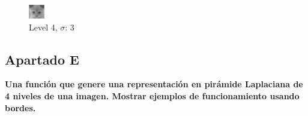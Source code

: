 \documentclass{article}
\begin{document}
\begin{minipage}{\linewidth}
     \begin{minipage}{0.45\linewidth}
        \begin{figure}[H]
            \includegraphics[width=\linewidth]{Ejercicio2d/cat4.png}          
			\caption{Level 4, $\sigma$: 3}
        \end{figure}
    \end{minipage}
\end{minipage}


\subsection*{Apartado E}
\textbf{Una función que genere una representación en pirámide Laplaciana de 4 niveles de una imagen. Mostrar ejemplos de funcionamiento usando bordes.}
\end{document}
